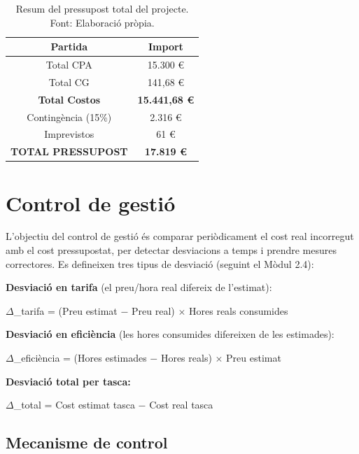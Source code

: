 \documentclass[12pt,a4paper,twoside]{report}
\begin{document}
\begin{table}[H]
\centering
\caption{Resum del pressupost total del projecte. Font: Elaboraci\'o pr\`opia.}
\label{tab:resum-pressupost}
\begin{tabular}{@{}cc@{}}
\toprule
\textbf{Partida} & \textbf{Import} \\
\midrule
Total CPA & 15.300 \euro \\
Total CG & 141,68 \euro \\
\textbf{Total Costos} & \textbf{15.441,68 \euro} \\
Conting\`encia (15\%) & 2.316 \euro \\
Imprevistos & 61 \euro \\
\midrule
\textbf{TOTAL PRESSUPOST} & \textbf{17.819 \euro} \\
\bottomrule
\end{tabular}
\end{table}

\section{Control de gesti\'o}
\label{sec:control-gestio}

L'objectiu del control de gesti\'o \'es comparar peri\`odicament el cost real incorregut amb el cost pressupostat, per detectar desviacions a temps i prendre mesures correctores. Es defineixen tres tipus de desviaci\'o (seguint el M\`odul 2.4):

\textbf{Desviaci\'o en tarifa} (el preu/hora real difereix de l'estimat):

\begin{center}
$\Delta$\_tarifa = (Preu estimat $-$ Preu real) $\times$ Hores reals consumides
\end{center}

\textbf{Desviaci\'o en efici\`encia} (les hores consumides difereixen de les estimades):

\begin{center}
$\Delta$\_efici\`encia = (Hores estimades $-$ Hores reals) $\times$ Preu estimat
\end{center}

\textbf{Desviaci\'o total per tasca:}

\begin{center}
$\Delta$\_total = Cost estimat tasca $-$ Cost real tasca
\end{center}

\subsection{Mecanisme de control}
\label{subsec:mecanisme-control}
\end{document}
